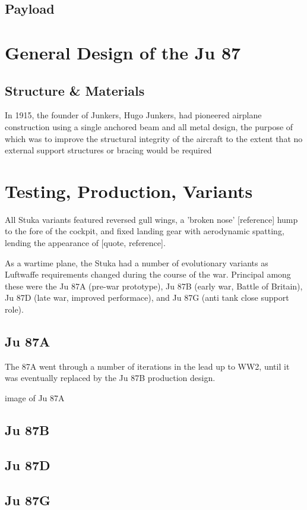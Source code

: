 \documentclass[a4paper, fontsize=11pt]{scrartcl} %
\begin{document}

\subsection{Payload}
\section{General Design of the Ju 87}
\subsection{Structure \& Materials}
In 1915, the founder of Junkers, Hugo Junkers, had pioneered airplane
construction using a single anchored beam and all metal design, the
purpose of which was to improve the structural integrity of the aircraft
to the extent that no external support structures or bracing would be
required
\section{Testing, Production, Variants}
All Stuka variants featured reversed gull wings, a 'broken nose' [reference]
hump to the fore of the cockpit, and fixed landing gear with aerodynamic
spatting\autocite[p.~4]{curry88}, lending the
appearance of [quote, reference]. %

As a wartime plane, the Stuka had a number of evolutionary variants as
Luftwaffe requirements changed during the course of the war. Principal among these were the Ju 87A
(pre-war prototype), Ju 87B (early war, Battle of Britain), Ju 87D
(late war, improved performace), and Ju 87G (anti tank close support
role).
\subsection{Ju 87A}
The 87A went through a number of iterations in the lead up to WW2,
until it was eventually replaced by the Ju 87B production design. 

{image of Ju 87A}
\subsection{Ju 87B}
\subsection{Ju 87D}
\subsection{Ju 87G}
\end{document}
